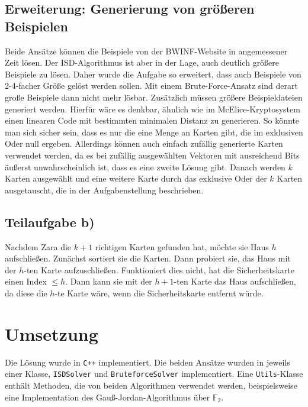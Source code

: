 \documentclass[a4paper,10pt,ngerman]{scrartcl}
\begin{document}
\subsection{Erweiterung: Generierung von größeren Beispielen}
Beide Ansätze können die Beispiele von der BWINF-Website in angemessener Zeit lösen.
Der ISD-Algorithmus ist aber in der Lage, auch deutlich größere Beispiele zu lösen. Daher wurde die Aufgabe so erweitert, dass auch Beispiele von 2-4-facher Größe gelöst werden sollen. Mit einem Brute-Force-Ansatz sind derart große Beispiele dann nicht mehr lösbar. Zusätzlich müssen größere Beispieldateien generiert werden.
Hierfür wäre es denkbar, ähnlich wie im McElice-Kryptosystem einen linearen Code mit bestimmten minimalen Distanz zu generieren. 
So könnte man sich sicher sein, dass es nur die eine Menge an Karten gibt, die im exklusiven Oder null ergeben. 
Allerdings können auch einfach zufällig generierte Karten verwendet werden, da es bei zufällig ausgewählten Vektoren mit ausreichend Bits äußerst unwahrscheinlich ist, dass es eine zweite Lösung gibt. 
Danach werden $k$ Karten ausgewählt und eine weitere Karte durch das exklusive Oder der $k$ Karten ausgetauscht, die in der Aufgabenstellung beschrieben.

\subsection{Teilaufgabe b)}
Nachdem Zara die $k+1$ richtigen Karten gefunden hat, möchte sie Haus $h$ aufschließen. Zunächst sortiert sie die Karten. Dann probiert sie, das Haus mit der $h$-ten Karte aufzuschließen. Funktioniert dies nicht, hat die Sicherheitskarte einen Index $\leq h$. Dann kann sie mit der $h+1$-ten Karte das Haus aufschließen, da diese die $h$-te Karte wäre, wenn die Sicherheitskarte entfernt würde.
\section{Umsetzung}
Die Lösung wurde in \texttt{C++} implementiert. Die beiden Ansätze wurden in jeweils einer Klasse, \lstinline{ISDSolver} und \lstinline{BruteforceSolver} implementiert. Eine \lstinline{Utils}-Klasse enthält Methoden, die von beiden Algorithmen verwendet werden, beispielsweise eine Implementation des Gauß-Jordan-Algorithmus über $\mathbb{F}_2$.
\end{document}
